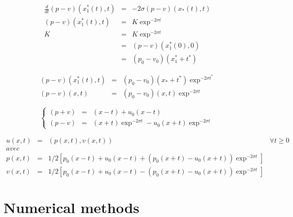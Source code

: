 \documentclass[a4paper,11pt]{article}
\begin{document}
\begin{equation*}
\begin{array}{rcl}
    \frac{d}{dt}(p-v)(x_{1}^{*}(t), t) &=& -2\sigma (p-v)(x_{*}(t), t) \\
    (p-v)(x_{1}^{*}(t), t) &=& K \exp^{-2\sigma t} \\
    K &=& K \exp^{-2\sigma t} \\
    &=& (p-v)(x_{1}^{*}(0), 0) \\
    &=& (p_{0}-v_{0})(x_{1}^{*} + t^{*})
\end{array}
\end{equation*}

\begin{equation*}
\begin{array}{rcl}
    (p-v)(x_{1}^{*}(t), t) &=& (p_{0}-v_{0})(x_{*} + t^{*})\exp^{-2\sigma t^{*}} \\
    (p-v)(x,t) &=& (p_{0}-v_{0})(x,t)\exp^{-2\sigma t} 
\end{array}
\end{equation*}

\begin{equation*}
\left\{
\begin{array}{rcl}
    (p+v) &=& (x - t) + u_{0}(x - t) \\
    (p-v) &=& (x + t) \exp^{-2\sigma t} - u_{0}(x + t) \exp^{-2\sigma t}
\end{array}
\right.
\end{equation*}

\begin{equation}
\begin{array}{rcll}
    u(x,t) &=& (p(x,t), v(x,t)) & \forall t \ge 0 \\
    avec & & & \\
    p(x,t) &=& 1/2\left[p_{0}(x - t) + u_{0}(x - t) + (p_{0}(x + t) - u_{0}(x + t))\exp^{-2\sigma t} \right] & \\
    v(x,t) &=& 1/2\left[p_{0}(x - t) + u_{0}(x - t) - (p_{0}(x + t) - u_{0}(x + t))\exp^{-2\sigma t} \right] &
\end{array}
\end{equation}


\subsubsection{}

\section{Numerical methods}

\subsection{}
\end{document}
